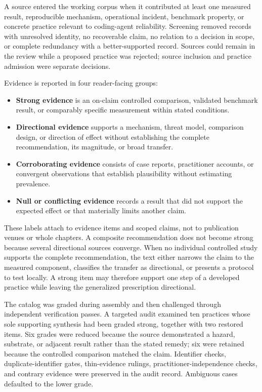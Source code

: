 A source entered the working corpus when it contributed at least one measured result, reproducible mechanism, operational incident, benchmark property, or concrete practice relevant to coding-agent reliability. Screening removed records with unresolved identity, no recoverable claim, no relation to a decision in scope, or complete redundancy with a better-supported record. Sources could remain in the review while a proposed practice was rejected; source inclusion and practice admission were separate decisions.


Evidence is reported in four reader-facing groups:

\begin{itemize}
\tightlist
\item
  \textbf{Strong evidence} is an on-claim controlled comparison, validated benchmark result, or comparably specific measurement within stated conditions.
\item
  \textbf{Directional evidence} supports a mechanism, threat model, comparison design, or direction of effect without establishing the complete recommendation, its magnitude, or broad transfer.
\item
  \textbf{Corroborating evidence} consists of case reports, practitioner accounts, or convergent observations that establish plausibility without estimating prevalence.
\item
  \textbf{Null or conflicting evidence} records a result that did not support the expected effect or that materially limits another claim.
\end{itemize}

These labels attach to evidence items and scoped claims, not to publication venues or whole chapters. A composite recommendation does not become strong because several directional sources converge. When no individual controlled study supports the complete recommendation, the text either narrows the claim to the measured component, classifies the transfer as directional, or presents a protocol to test locally. A strong item may therefore support one step of a developed practice while leaving the generalized prescription directional.

The catalog was graded during assembly and then challenged through independent verification passes. A targeted audit examined ten practices whose sole supporting synthesis had been graded strong, together with two restored items. Six grades were reduced because the source demonstrated a hazard, substrate, or adjacent result rather than the stated remedy; six were retained because the controlled comparison matched the claim. Identifier checks, duplicate-identifier gates, thin-evidence rulings, practitioner-independence checks, and contrary evidence were preserved in the audit record. Ambiguous cases defaulted to the lower grade.

